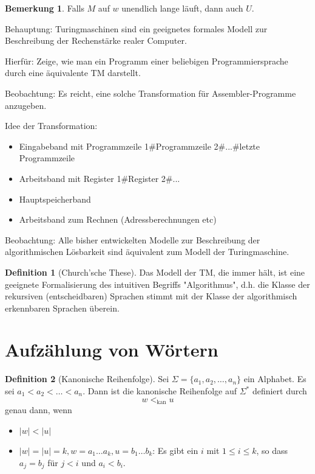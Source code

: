 \documentclass[11pt]{article} %
\theoremstyle{definition}
\newtheorem{definition}{Definition}
\newtheorem*{bemerkung}{Bemerkung}
\begin{document}
\begin{bemerkung}
Falls $M$ auf $w$ unendlich lange läuft, dann auch $U$.
\end{bemerkung}

Behauptung: Turingmaschinen sind ein geeignetes formales Modell zur Beschreibung der Rechenstärke realer Computer.

Hierfür: Zeige, wie man ein Programm einer beliebigen Programmiersprache durch eine äquivalente TM darstellt.

Beobachtung: Es reicht, eine solche Transformation für Assembler-Programme anzugeben.

Idee der Transformation:

\begin{itemize}
\item Eingabeband mit Programmzeile 1\#Programmzeile 2\#...\#letzte Programmzeile

\item Arbeitsband mit Register 1\#Register 2\#...

\item Hauptspeicherband

\item Arbeitsband zum Rechnen (Adressberechnungen etc)
\end{itemize}

Beobachtung: Alle bisher entwickelten Modelle zur Beschreibung der algorithmischen Lösbarkeit sind äquivalent zum Modell der Turingmaschine.

\begin{definition}[Church'sche These]
Das Modell der TM, die immer hält, ist eine geeignete Formalisierung des intuitiven Begriffs "Algorithmus", d.h. die Klasse der rekursiven (entscheidbaren) Sprachen stimmt mit der Klasse der algorithmisch erkennbaren Sprachen überein.
\end{definition}

\section{Aufzählung von Wörtern}

\begin{definition}[Kanonische Reihenfolge]
Sei $\Sigma = \{a_1, a_2, \dots, a_n\}$ ein Alphabet. Es sei $a_1 < a_2 < \dots < a_n$. Dann ist die kanonische Reihenfolge auf $\Sigma^*$ definiert durch 
\[
w <_{\textrm{kan}} u
\]
genau dann, wenn
\begin{itemize}
\item $|w| < |u|$
\item $|w| = |u| = k, w = a_1\dots a_k, u = b_1\dots b_k$: Es gibt ein $i$ mit $1\le i \le k$, so dass $a_j = b_j$ für $j < i$ und $a_i < b_i$.
\end{itemize}

\end{definition}
\end{document}
